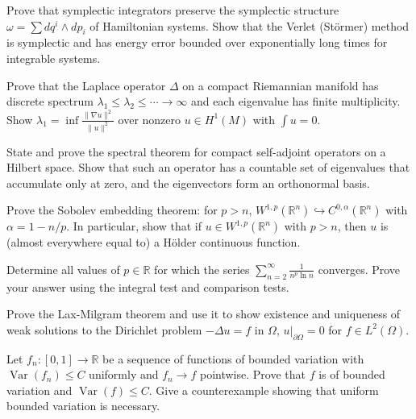 \documentclass[12pt,a4paper]{exam}
\begin{document}
\begin{questions}
\vspace{0.3cm}

\question[5]
Prove that symplectic integrators preserve the symplectic structure $\omega = \sum dq^i \wedge dp_i$ of Hamiltonian systems. Show that the Verlet (St\"ormer) method is symplectic and has energy error bounded over exponentially long times for integrable systems.

\vspace{0.3cm}

\question[7]
Prove that the Laplace operator $\Delta$ on a compact Riemannian manifold has discrete spectrum $\lambda_1 \leq \lambda_2 \leq \cdots \to \infty$ and each eigenvalue has finite multiplicity. Show $\lambda_1 = \inf \frac{\|\nabla u\|^2}{\|u\|^2}$ over nonzero $u \in H^1(M)$ with $\int u = 0$.

\vspace{0.3cm}

\question[2]
State and prove the spectral theorem for compact self-adjoint operators on a Hilbert space. Show that such an operator has a countable set of eigenvalues that accumulate only at zero, and the eigenvectors form an orthonormal basis.

\vspace{0.3cm}

\question[3]
Prove the Sobolev embedding theorem: for $p > n$, $W^{1,p}(\mathbb{R}^n) \hookrightarrow C^{0,\alpha}(\mathbb{R}^n)$ with $\alpha = 1 - n/p$. In particular, show that if $u \in W^{1,p}(\mathbb{R}^n)$ with $p > n$, then $u$ is (almost everywhere equal to) a H\"older continuous function.

\vspace{0.3cm}

\question[5]
Determine all values of $p \in \mathbb{R}$ for which the series $\sum_{n=2}^{\infty} \frac{1}{n^p \ln n}$ converges. Prove your answer using the integral test and comparison tests.

\vspace{0.3cm}

\question[6]
Prove the Lax-Milgram theorem and use it to show existence and uniqueness of weak solutions to the Dirichlet problem $-\Delta u = f$ in $\Omega$, $u|_{\partial\Omega} = 0$ for $f \in L^2(\Omega)$.

\vspace{0.3cm}

\question[3]
Let $f_n: [0,1] \to \mathbb{R}$ be a sequence of functions of bounded variation with $\operatorname{Var}(f_n) \leq C$ uniformly and $f_n \to f$ pointwise. Prove that $f$ is of bounded variation and $\operatorname{Var}(f) \leq C$. Give a counterexample showing that uniform bounded variation is necessary.


\end{questions}
\end{document}
